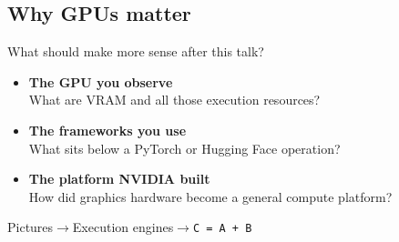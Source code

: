 \documentclass[aspectratio=169,t]{beamer}
\begin{document}
\subsection{Why GPUs matter}
\begin{frame}{What should make more sense after this talk?}
  \vspace{.25cm}
  \begin{itemize}
    \setlength{\itemsep}{.8em}
    \item \textbf{The GPU you observe}\\
      {\color{muted}What are VRAM and all those execution resources?}
    \item \textbf{The frameworks you use}\\
      {\color{muted}What sits below a PyTorch or Hugging Face operation?}
    \item \textbf{The platform NVIDIA built}\\
      {\color{muted}How did graphics hardware become a general compute platform?}
  \end{itemize}
  \vspace{.5cm}
  {\small\color{work}Pictures\quad$\longrightarrow$\quad Execution engines\quad$\longrightarrow$\quad\texttt{C = A + B}}
\end{frame}
\end{document}
